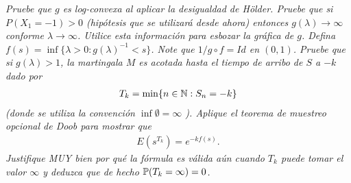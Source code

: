 \emph{
    Pruebe que $g$ es log-convexa al aplicar la desigualdad de H\"older. Pruebe que si $P(X_1=-1)>0$ (hip\'otesis que se utilizar\'a desde ahora) 
    entonces $g(\lambda)\to\infty$ conforme $\lambda\to\infty$. Utilice esta informaci\'on para esbozar la gr\'afica de $g$. 
    Defina $ f(s)=\inf \{ \lambda>0:g(\lambda)^{-1} < s\} $. Note que $1/g\circ f=Id$ en $(0,1)$. Pruebe que si $g(\lambda)>1$, 
    la martingala $M$ es acotada hasta el tiempo de arribo de $S$ a $-k$ dado por 
    \begin{align}
        T_k =\min \{n\in\mathbb{N}:S_n=-k\} 
    \end{align}
    (donde se utiliza la convenci\'on $\inf\emptyset=\infty$ ). Aplique el teorema de muestreo opcional de Doob para mostrar que 
    \begin{align}
        E(s^{T_k})=e^{-k f(s)}.
    \end{align}
    Justifique MUY bien por qu\'e la f\'ormula es válida aún cuando $T_k$ puede tomar el valor $\infty$ y deduzca que de hecho $ \mathbb{P}  (T_k=\infty)=0$.
}